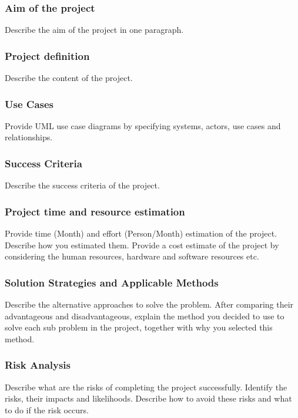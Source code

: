 \documentclass{mefsdp}
\begin{document}
	\subsubsection{Aim of the project}
	Describe the aim of the project in one paragraph.
	
	\subsubsection{Project definition}
	Describe the content of the project. 
	
	\subsubsection{Use Cases}
	Provide UML use case diagrams by specifying systems, actors, use cases and relationships. \cite{kahneman2011thinking}
	
	\subsubsection{Success Criteria}
	Describe the success criteria of the project. 
	
	\subsubsection{Project time and resource estimation}
	Provide time (Month) and effort (Person/Month) estimation of the project. Describe how you estimated them. Provide a cost estimate of the project by considering the human resources, hardware and software resources etc.
	
	\subsubsection{Solution Strategies and Applicable Methods}
	Describe the alternative approaches to solve the problem. After comparing their advantageous and disadvantageous, explain the method you decided to use to solve each sub problem in the project, together with why you selected this method. 
	
	\subsubsection{Risk Analysis}
	Describe what are the risks of completing the project successfully. Identify the risks, their impacts and likelihoods. Describe how to avoid these risks and what to do if the risk occurs. \cite{duan2017question}
	
\end{document}
